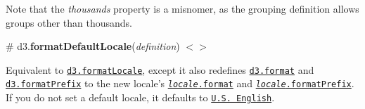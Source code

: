 Note that the {\itshape thousands} property is a misnomer, as the grouping definition allows groups other than thousands.

\label{_formatDefaultLocale}%
\# d3.{\bfseries format\+Default\+Locale}({\itshape definition}) \href{https://github.com/d3/d3-format/blob/master/src/defaultLocale.js}{\tt $<$$>$}

Equivalent to \href{#formatLocale}{\tt d3.\+format\+Locale}, except it also redefines \href{#format}{\tt d3.\+format} and \href{#formatPrefix}{\tt d3.\+format\+Prefix} to the new locale’s \href{#locale_format}{\tt {\itshape locale}.format} and \href{#locale_formatPrefix}{\tt {\itshape locale}.format\+Prefix}. If you do not set a default locale, it defaults to \href{https://github.com/d3/d3-format/blob/master/locale/en-US.json}{\tt U.\+S. English}. 